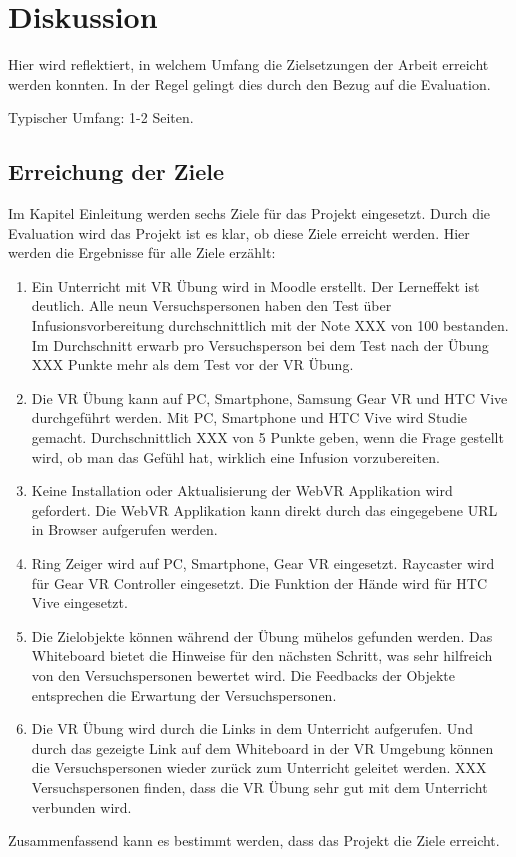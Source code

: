 \chapter{Diskussion}

Hier wird reflektiert, in welchem Umfang die Zielsetzungen der Arbeit erreicht werden konnten. In der Regel gelingt dies durch den Bezug auf die Evaluation.

Typischer Umfang: 1-2 Seiten.

\section{Erreichung der Ziele}

Im Kapitel Einleitung werden sechs Ziele für das Projekt eingesetzt. Durch die Evaluation wird das Projekt ist es klar, ob diese Ziele erreicht werden. Hier werden die Ergebnisse für alle Ziele erzählt:

\begin{enumerate}[labelsep=1ex]
	\renewcommand{\labelenumi}{\textbf{Z\theenumi.}}
	\item Ein Unterricht mit VR Übung wird in Moodle erstellt. Der Lerneffekt ist deutlich. Alle neun Versuchspersonen haben den Test über Infusionsvorbereitung durchschnittlich mit der Note XXX von 100 bestanden. Im Durchschnitt erwarb pro Versuchsperson bei dem Test nach der Übung XXX Punkte mehr als dem Test vor der VR Übung.
	
	\item Die VR Übung kann auf PC, Smartphone, Samsung Gear VR und HTC Vive durchgeführt werden. Mit PC, Smartphone und HTC Vive wird Studie gemacht. Durchschnittlich XXX von 5 Punkte geben, wenn die Frage gestellt wird, ob man das Gefühl hat, wirklich eine Infusion vorzubereiten.
	
	\item Keine Installation oder Aktualisierung der WebVR Applikation wird gefordert. Die WebVR Applikation kann direkt durch das eingegebene URL in Browser aufgerufen werden.
	
	\item Ring Zeiger wird auf PC, Smartphone, Gear VR eingesetzt. Raycaster wird für Gear VR Controller eingesetzt. Die Funktion der Hände wird für HTC Vive eingesetzt.
	
	\item Die Zielobjekte können während der Übung mühelos gefunden werden. Das Whiteboard bietet die Hinweise für den nächsten Schritt, was sehr hilfreich von den Versuchspersonen bewertet wird. Die Feedbacks der Objekte entsprechen die Erwartung der Versuchspersonen.
	
	\item Die VR Übung wird durch die Links in dem Unterricht aufgerufen. Und durch das gezeigte Link auf dem Whiteboard in der VR Umgebung können die Versuchspersonen wieder zurück zum Unterricht geleitet werden. XXX Versuchspersonen finden, dass die VR Übung sehr gut mit dem Unterricht verbunden wird.
	
\end{enumerate}

Zusammenfassend kann es bestimmt werden, dass das Projekt die Ziele erreicht.

